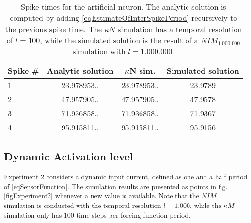 \begin{table}[hbt!p]
	\centering
	\begin{tabular}{|l|ccc|}
		\hline 
		Spike \#	& Analytic solution & 	$\kappa$N sim. 	& Simulated solution \\ %
		\hline
		1 			& 23.978953.. 		& 	23.978953.. 			& 23.9789 			\\	
		2 			& 47.957905.. 		& 	47.957905.. 			& 47.9578 			\\
		3 			& 71.936858.. 	 	& 	71.936858.. 			& 71.9367 			\\
		4 			& 95.915811.. 	 	& 	95.915811.. 			& 95.9156 			
		\\ \hline 
	\end{tabular}
	\caption{ 	Spike times for the artificial neuron. 
				The analytic solution is computed by adding \eqref{eqEstimateOfInterSpikePeriod} recursively to the previous spike time. 
				The $\kappa N$ simulation has a temporal resolution of $l=100$, %
					while the simulated solution is the result of a $NIM_{1.000.000}$ simulation with $l=1.000.000$.
			}
	\label{tabSpikeTimesForKonstK}
\end{table}




		\subsection{Dynamic Activation level}
			Experiment 2 considers a dynamic input current, defined as one and a half period of \eqref{eqSensorFunction}.
			The simulation results are presented as points in fig. \ref{figExperiment2} whenever a new value is available.
			Note that the $NIM$ simulation is conducted with the temporal resolution $l = 1.000$, while the $\kappa M$ simulation only has $100$ time steps per forcing function period.

